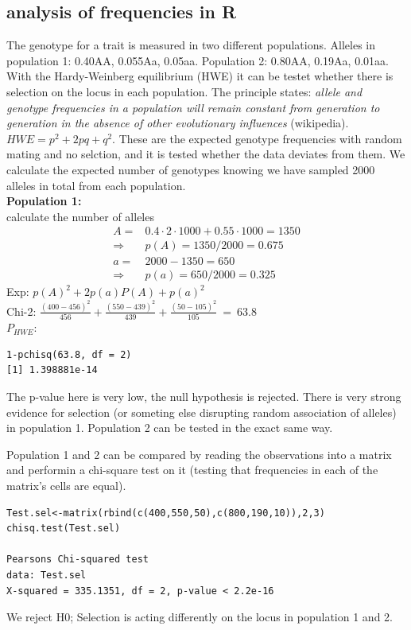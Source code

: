 \documentclass{article}
\begin{document}
\subsection{analysis of frequencies in R}
The genotype for a trait is measured in two different populations. Alleles in population 1: 0.40AA, 0.055Aa, 0.05aa. Population 2: 0.80AA, 0.19Aa, 0.01aa. With the Hardy-Weinberg equilibrium (HWE) it can be testet whether there is selection on the locus in each population. The principle states: \textit{allele and genotype frequencies in a population will remain constant from generation to generation in the absence of other evolutionary influences} (wikipedia). $HWE = p^2+2pq+q^2$. These are the expected genotype frequencies with random mating and no selction, and it is tested whether the data deviates from them. We calculate the expected number of genotypes knowing we have sampled 2000 alleles in total from each population.\\
\textbf{Population 1:}\\
calculate the number of alleles
\begin{equation*}
\begin{split}
    A  = & 0.4 \cdot 2 \cdot 1000 + 0.55 \cdot 1000 = 1350  \\
     \Rightarrow& p(A) = 1350/2000 = 0.675\\
    a  =& 2000-1350 = 650 \\
    \Rightarrow& p(a) = 650/2000 = 0.325
\end{split}
\end{equation*}
Exp: $p(A)^2 + 2p(a)P(A) + p(a)^2$ \\
Chi-2: $\frac{(400-456)^2}{456} + \frac{(550-439)^2}{439} + \frac{(50-105)^2}{105} \: = \: 63.8$\\
$P_{HWE}:$
\begin{lstlisting}
1-pchisq(63.8, df = 2)
[1] 1.398881e-14
\end{lstlisting}
The p-value here is very low, the null hypothesis is rejected. There is very strong evidence for selection (or someting else disrupting random association of alleles) in population 1. Population 2 can be tested in the exact same way.\par
Population 1 and 2 can be compared  by reading the observations into a matrix and performin a chi-square test on it (testing that frequencies in each of the matrix's cells are equal).
\begin{lstlisting}
Test.sel<-matrix(rbind(c(400,550,50),c(800,190,10)),2,3)
chisq.test(Test.sel)

Pearsons Chi-squared test
data: Test.sel
X-squared = 335.1351, df = 2, p-value < 2.2e-16
\end{lstlisting}
We reject H0; Selection is acting differently on the locus in population 1 and 2.
\end{document}
